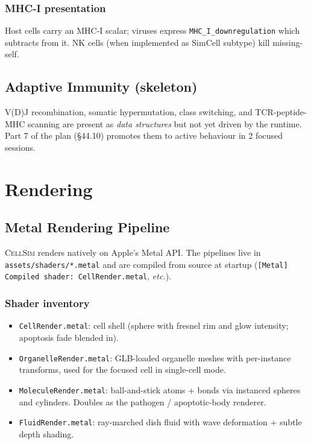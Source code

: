 \documentclass[11pt,letterpaper,twoside,openany]{book}
\newcommand{\code}[1]{\texttt{#1}}
\newcommand{\file}[1]{\texttt{\small#1}}
\begin{document}
\section{MHC-I presentation}

Host cells carry an MHC-I scalar; viruses express
\code{MHC\_I\_downregulation} which subtracts from it. NK cells
(when implemented as SimCell subtype) kill missing-self.

\chapter{Adaptive Immunity (skeleton)}
\label{ch:adaptive}

V(D)J recombination, somatic hypermutation, class switching, and
TCR-peptide-MHC scanning are present as \emph{data structures} but
not yet driven by the runtime. Part 7 of the plan (§44.10)
promotes them to active behaviour in 2 focused sessions.

\part{Rendering}

\chapter{Metal Rendering Pipeline}
\label{ch:metal}

\textsc{CellSim} renders natively on Apple's Metal API. The
pipelines live in \file{assets/shaders/*.metal} and are compiled
from source at startup (\texttt{[Metal] Compiled shader:
CellRender.metal}, \emph{etc.}).

\section{Shader inventory}

\begin{itemize}
  \item \file{CellRender.metal}: cell shell (sphere with fresnel
        rim and glow intensity; apoptosis fade blended in).
  \item \file{OrganelleRender.metal}: GLB-loaded organelle meshes
        with per-instance transforms, used for the focused cell in
        single-cell mode.
  \item \file{MoleculeRender.metal}: ball-and-stick atoms + bonds
        via instanced spheres and cylinders. Doubles as the
        pathogen / apoptotic-body renderer.
  \item \file{FluidRender.metal}: ray-marched dish fluid with
        wave deformation + subtle depth shading.
\end{itemize}
\end{document}
